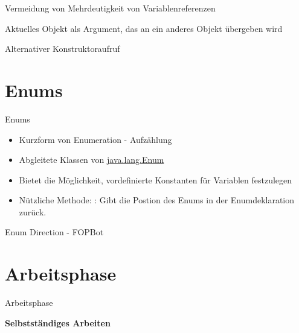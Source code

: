 \documentclass{../tuda-beamer}
\begin{document}
  \begin{frame}{Vermeidung von Mehrdeutigkeit von Variablenreferenzen}
    
  \end{frame}

  \begin{frame}{Aktuelles Objekt als Argument, das an ein anderes Objekt übergeben wird}
    
  \end{frame}

  \begin{frame}[c]{Alternativer Konstruktoraufruf}
    
  \end{frame}


  \section{Enums}
  \begin{frame}{Enums}
    \begin{itemize}
      \item Kurzform von Enumeration - Aufzählung
      \item Abgleitete Klassen von \href{https://docs.oracle.com/en/java/javase/11/docs/api/java
.base/java/lang/Enum.html}{java.lang.Enum}
      \item Bietet die Möglichkeit, vordefinierte Konstanten für Variablen festzulegen
      \item Nützliche Methode: : Gibt die Postion des Enums in der
      Enumdeklaration zurück.
    \end{itemize}
  \end{frame}

  \begin{frame}{Enum Direction - FOPBot}
    
  \end{frame}


  \section{Arbeitsphase}
  \begin{frame}[c]{Arbeitsphase}
    \begin{center}
      \textbf{\LARGE Selbstständiges Arbeiten}
    \end{center}
  \end{frame}
\end{document}
